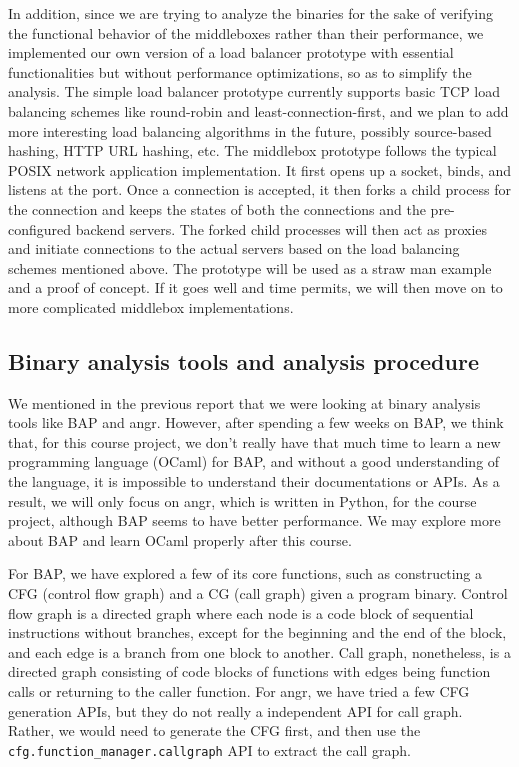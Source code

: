 In addition, since we are trying to analyze the binaries for the sake of
verifying the functional behavior of the middleboxes rather than their
performance, we implemented our own version of a load balancer prototype with
essential functionalities but without performance optimizations, so as to
simplify the analysis. The simple load balancer prototype currently supports
basic TCP load balancing schemes like round-robin and least-connection-first,
and we plan to add more interesting load balancing algorithms in the future,
possibly source-based hashing, HTTP URL hashing, etc. The middlebox prototype
follows the typical POSIX network application implementation. It first opens up
a socket, binds, and listens at the port. Once a connection is accepted, it then
forks a child process for the connection and keeps the states of both the
connections and the pre-configured backend servers. The forked child processes
will then act as proxies and initiate connections to the actual servers based on
the load balancing schemes mentioned above. The prototype will be used as a
straw man example and a proof of concept. If it goes well and time permits, we
will then move on to more complicated middlebox implementations.

\subsection{Binary analysis tools and analysis procedure}

We mentioned in the previous report that we were looking at binary analysis
tools like BAP and angr. However, after spending a few weeks on BAP, we think
that, for this course project, we don't really have that much time to learn a
new programming language (OCaml) for BAP, and without a good understanding of
the language, it is impossible to understand their documentations or APIs. As a
result, we will only focus on angr, which is written in Python, for the course
project, although BAP seems to have better performance. We may explore more
about BAP and learn OCaml properly after this course.

For BAP, we have explored a few of its core functions, such as constructing a
CFG (control flow graph) and a CG (call graph) given a program binary. Control
flow graph is a directed graph where each node is a code block of sequential
instructions without branches, except for the beginning and the end of the
block, and each edge is a branch from one block to another. Call graph,
nonetheless, is a directed graph consisting of code blocks of functions with
edges being function calls or returning to the caller function. For angr, we
have tried a few CFG generation APIs, but they do not really a independent API
for call graph. Rather, we would need to generate the CFG first, and then use
the \texttt{cfg.function\_manager.callgraph} API to extract the call graph.

